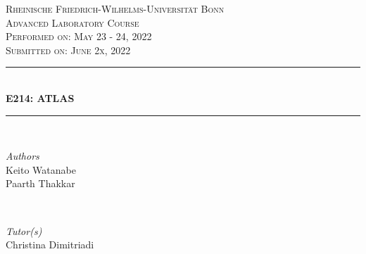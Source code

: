 \documentclass[a4paper]{report}
\numberwithin{equation}{section}
\begin{document}
\begin{titlepage} %
	\newcommand{\HRule}{\rule{\linewidth}{0.5mm}} %
	
	\center %
	
	\textsc{\LARGE Rheinische Friedrich-Wilhelms-Universit\"at Bonn }\\[4cm] %
	
	\textsc{\Large Advanced Laboratory Course}\\[0.5cm] %
	
	\textsc{\large Performed on: May 23 - 24, 2022}\\[0.5cm] %

	\textsc{\large Submitted on: June 2x, 2022}\\[0.5cm] %
	
	
	\HRule\\[0.4cm]
	
	{\huge\bfseries E214: ATLAS}\\[0.4cm] %
	
	\HRule\\[1.5cm]
	
	
	\begin{minipage}{0.4\textwidth}
		\begin{flushleft}
			\large
			\textit{Authors}\\
			Keito Watanabe \\
			Paarth Thakkar
		\end{flushleft}
	\end{minipage}
	~
	\begin{minipage}{0.4\textwidth}
		\begin{flushright}
			\large
			\textit{Tutor(s)}\\
			Christina Dimitriadi
		\end{flushright}
	\end{minipage}


\end{titlepage}
\end{document}
